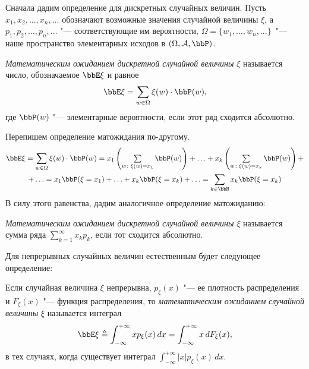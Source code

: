Сначала дадим определение для дискретных случайных величин. Пусть $x_1,x_2,\dots,x_n,\dots$ обозначают возможные значения случайной величины $\xi$, а $p_1,p_2,\dots,p_n,\dots$ "--- соответствующие им вероятности, $\Omega = \{w_1,\dots, w_n,...\}$~"--- наше пространство элементарных исходов в $(\Omega,\mathcal A, \bbP)$. 
\begin{defn}\label{teorver1}
\textit{Математическим ожиданием дискретной случайной величины} $\xi$ называется число, обозначаемое $\bbE\xi$ и равное
\begin{equation}
\bbE\xi = \sum_{w \in \Omega} \xi(w)\cdot \bbP(w),
\end{equation}
где $\bbP(w)$ "--- элементарные вероятности, если этот ряд сходится абсолютно.
\end{defn}
Перепишем определение матожидания по-другому.
\begin{multline*}
\bbE\xi=\sum_{w \in \Omega} \xi(w)\cdot \bbP(w)=x_1\left(\textstyle\sum\limits_{w\colon \xi(w)=x_1} \bbP(w)\right)+\ldots+x_k\left(\textstyle\sum\limits_{w\colon \xi(w)=x_k} \bbP(w)\right)+\\+\ldots =x_1\bbP(\xi=x_1)+\ldots+ x_k\bbP(\xi=x_k)+\ldots=\sum_{k\in \bbN} x_k\bbP(\xi=x_k)
\end{multline*}
В силу этого равенства, дадим аналогичное определение матожиданию:
\begin{defnn}\label{teorver1s}
\textit{Математическим ожиданием дискретной случайной величины} $\xi$ называется сумма ряда $\sum\limits_{k=1}^{\infty}x_k p_k$, если тот сходится абсолютно.
\end{defnn}

Для непрерывных случайных величин естественным будет следующее определение: 
\begin{defn} 
Если случайная величина $\xi$ непрерывна, $p_{\xi}(x)$ "--- ее плотность распределения и $F_\xi(x)$ "--- функция распределения,  то \textit{математическим ожиданием} \textit{случайной величины} $\xi$ называется интеграл
\begin{equation}\label{ch32:eq:mat_oz_nepr}
\bbE\xi\triangleq\int_{-\infty}^{+\infty} xp_{\xi}(x)\,dx = \int_{-\infty}^{+\infty} x\,dF_\xi(x),
\end{equation}
в тех случаях, когда существует интеграл $\int_{-\infty}^{+\infty} |x|p_{\xi}(x)\,dx.$ 
\end{defn}

